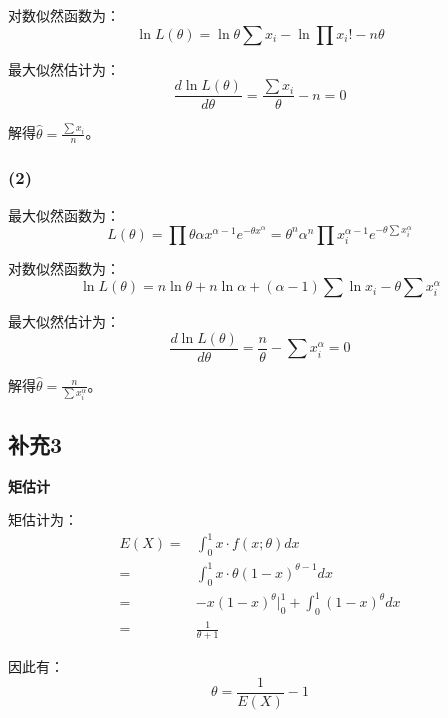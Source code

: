 \documentclass[a4paper,12pt]{ctexart}
\begin{document}
对数似然函数为：
\begin{equation*}
	\ln L(\theta) = \ln \theta \sum x_i - \ln \prod x_i! - n \theta
\end{equation*}

最大似然估计为：
\begin{equation*}
	\frac{d \ln L(\theta)}{d \theta} = \frac{\sum x_i}{\theta} - n = 0
\end{equation*}

解得$\hat{\theta} = \frac{\sum x_i}{n}$。

\subsubsection*{(2)}

最大似然函数为：
\begin{equation*}
	L(\theta) = \prod \theta \alpha x^{\alpha - 1} e^{-\theta x^{\alpha}} = \theta^n \alpha^n \prod x_i^{\alpha - 1} e^{-\theta \sum x_i^{\alpha}}
\end{equation*}

对数似然函数为：
\begin{equation*}
	\ln L(\theta) = n \ln \theta + n \ln \alpha + (\alpha - 1) \sum \ln x_i - \theta \sum x_i^{\alpha}
\end{equation*}

最大似然估计为：
\begin{equation*}
	\frac{d \ln L(\theta)}{d \theta} = \frac{n}{\theta} - \sum x_i^{\alpha} = 0
\end{equation*}

解得$\hat{\theta} = \frac{n}{\sum x_i^{\alpha}}$。

\subsection*{补充3}

\textbf{矩估计}

矩估计为：
\begin{align*}
	E(X) =& \int_{0}^{1} x \cdot f(x ; \theta) dx \\
	=& \int_{0}^{1} x \cdot \theta (1 - x)^{\theta - 1} dx \\
	=& - x (1 - x)^{\theta} \bigg|_{0}^{1} + \int_{0}^{1} (1 - x)^{\theta} dx \\
	=& \frac{1}{\theta + 1}
\end{align*}

因此有：
\begin{equation*}
	\theta = \frac{1}{E(X)} - 1
\end{equation*}
\end{document}
